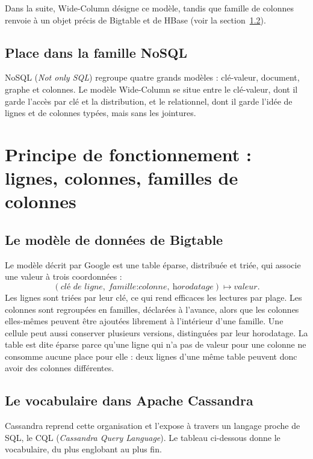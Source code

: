 \documentclass[11pt,a4paper]{article}
\begin{document}
Dans la suite, \og Wide-Column \fg{} désigne ce modèle, tandis que \og famille de colonnes \fg{} renvoie à un objet précis de Bigtable et de HBase (voir la section~\ref{sec:vocab}).

\subsection{Place dans la famille NoSQL}
NoSQL (\emph{Not only SQL}) regroupe quatre grands modèles : clé-valeur, document, graphe et colonnes. Le modèle Wide-Column se situe entre le clé-valeur, dont il garde l'accès par clé et la distribution, et le relationnel, dont il garde l'idée de lignes et de colonnes typées, mais sans les jointures.

\section{Principe de fonctionnement : lignes, colonnes, familles de colonnes}

\subsection{Le modèle de données de Bigtable}
Le modèle décrit par Google \cite{bigtable} est une table éparse, distribuée et triée, qui associe une valeur à trois coordonnées :
\[
(\textit{clé de ligne},\ \textit{famille:colonne},\ \textit{horodatage}) \longmapsto \textit{valeur}.
\]
Les lignes sont triées par leur clé, ce qui rend efficaces les lectures par plage. Les colonnes sont regroupées en familles, déclarées à l'avance, alors que les colonnes elles-mêmes peuvent être ajoutées librement à l'intérieur d'une famille. Une cellule peut aussi conserver plusieurs versions, distinguées par leur horodatage. La table est dite éparse parce qu'une ligne qui n'a pas de valeur pour une colonne ne consomme aucune place pour elle : deux lignes d'une même table peuvent donc avoir des colonnes différentes.

\subsection{Le vocabulaire dans Apache Cassandra}
\label{sec:vocab}
Cassandra reprend cette organisation et l'expose à travers un langage proche de SQL, le CQL (\emph{Cassandra Query Language}). Le tableau ci-dessous donne le vocabulaire, du plus englobant au plus fin.
\end{document}
